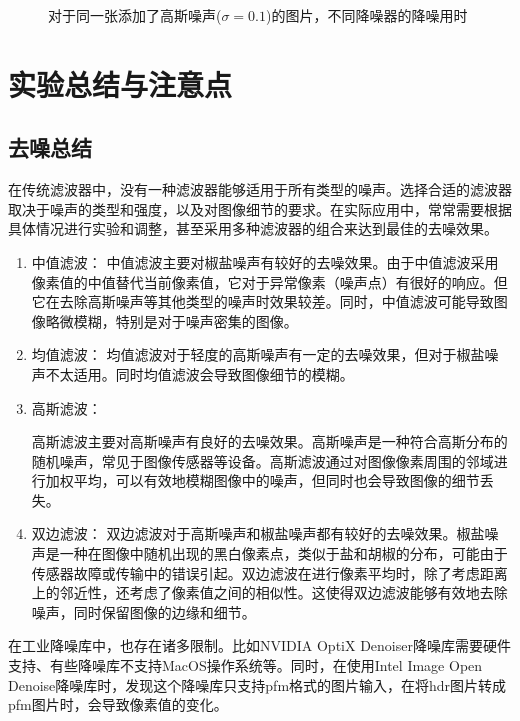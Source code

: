 \documentclass[lang=cn,10pt]{elegantbook}
\begin{document}
\begin{figure}[htbp]
	\centering
	\caption{对于同一张添加了高斯噪声($\sigma=0.1$)的图片，不同降噪器的降噪用时}
	\label{fig:time}
\end{figure}

\chapter{实验总结与注意点}
\section{去噪总结}
在传统滤波器中，没有一种滤波器能够适用于所有类型的噪声。选择合适的滤波器取决于噪声的类型和强度，以及对图像细节的要求。在实际应用中，常常需要根据具体情况进行实验和调整，甚至采用多种滤波器的组合来达到最佳的去噪效果。
\begin{enumerate}[itemsep=1.5ex]
\item 中值滤波：
中值滤波主要对椒盐噪声有较好的去噪效果。由于中值滤波采用像素值的中值替代当前像素值，它对于异常像素（噪声点）有很好的响应。但它在去除高斯噪声等其他类型的噪声时效果较差。同时，中值滤波可能导致图像略微模糊，特别是对于噪声密集的图像。


\item 均值滤波：
均值滤波对于轻度的高斯噪声有一定的去噪效果，但对于椒盐噪声不太适用。同时均值滤波会导致图像细节的模糊。

\item 高斯滤波：

高斯滤波主要对高斯噪声有良好的去噪效果。高斯噪声是一种符合高斯分布的随机噪声，常见于图像传感器等设备。高斯滤波通过对图像像素周围的邻域进行加权平均，可以有效地模糊图像中的噪声，但同时也会导致图像的细节丢失。


\item 双边滤波：
双边滤波对于高斯噪声和椒盐噪声都有较好的去噪效果。椒盐噪声是一种在图像中随机出现的黑白像素点，类似于盐和胡椒的分布，可能由于传感器故障或传输中的错误引起。双边滤波在进行像素平均时，除了考虑距离上的邻近性，还考虑了像素值之间的相似性。这使得双边滤波能够有效地去除噪声，同时保留图像的边缘和细节。
\end{enumerate}

\vspace{5pt}
在工业降噪库中，也存在诸多限制。比如NVIDIA OptiX Denoiser降噪库需要硬件支持、有些降噪库不支持MacOS操作系统等。同时，在使用Intel Image Open Denoise降噪库时，发现这个降噪库只支持pfm格式的图片输入，在将hdr图片转成pfm图片时，会导致像素值的变化。
\end{document}
